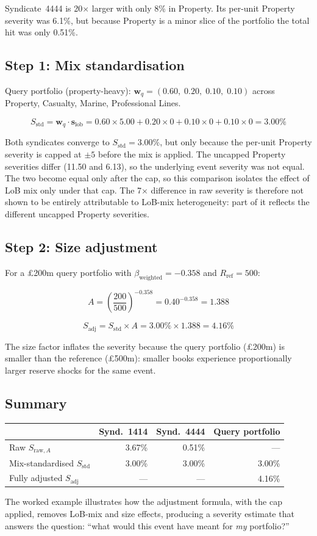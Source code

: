 Syndicate~4444 is 20$\times$ larger with only 8\% in Property.  Its
per-unit Property severity was 6.1\%, but because Property is a minor
slice of the portfolio the total hit was only 0.51\%.

\subsection*{Step 1: Mix standardisation}

Query portfolio (property-heavy):
$\mathbf{w}_q = (0.60,\; 0.20,\; 0.10,\; 0.10)$ across Property,
Casualty, Marine, Professional Lines.

\[
S_{\text{std}} = \mathbf{w}_q \cdot \mathbf{s}_{\text{lob}}
  = 0.60 \times 5.00 + 0.20 \times 0 + 0.10 \times 0 + 0.10 \times 0
  = 3.00\%
\]

Both syndicates converge to $S_{\text{std}} = 3.00\%$, but only because
the per-unit Property severity is capped at $\pm 5$ before the mix is
applied.  The uncapped Property severities differ (11.50 and 6.13), so
the underlying event severity was not equal.  The two become equal only
after the cap, so this comparison isolates the effect of LoB mix only
under that cap.  The 7$\times$ difference in raw severity is therefore
not shown to be entirely attributable to LoB-mix heterogeneity: part of
it reflects the different uncapped Property severities.

\subsection*{Step 2: Size adjustment}

For a \pounds 200m query portfolio with $\beta_{\text{weighted}} = -0.358$
and $R_{\text{ref}} = 500$:

\[
A = \left(\frac{200}{500}\right)^{-0.358} = 0.40^{-0.358} = 1.388
\]

\[
S_{\text{adj}} = S_{\text{std}} \times A = 3.00\% \times 1.388 = 4.16\%
\]

The size factor inflates the severity because the query portfolio
(\pounds 200m) is smaller than the reference (\pounds 500m): smaller
books experience proportionally larger reserve shocks for the same
event.

\subsection*{Summary}

\begin{tabular}{lrrr}
\toprule
 & Synd.\ 1414 & Synd.\ 4444 & Query portfolio \\
\midrule
Raw $S_{\text{raw},A}$ & 3.67\% & 0.51\% & --- \\
Mix-standardised $S_{\text{std}}$ & 3.00\% & 3.00\% & 3.00\% \\
Fully adjusted $S_{\text{adj}}$ & --- & --- & 4.16\% \\
\bottomrule
\end{tabular}

\medskip
The worked example illustrates how the adjustment formula, with the
cap applied, removes LoB-mix and size effects, producing a severity estimate
that answers the question: ``what would this event have meant for
\emph{my} portfolio?''
